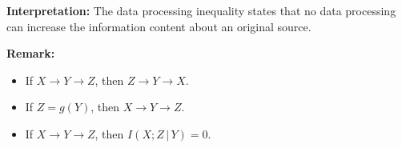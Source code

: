 \noindent\textbf{Interpretation:} The data processing inequality states that no data processing can increase the information content about an original source.

\noindent\textbf{Remark:}
\begin{itemize}
    \item If $X\to Y \to Z$, then $Z \to Y \to X$.
    \item If $Z=g(Y)$, then $X \to Y \to Z$.
    \item If $X\to Y \to Z$, then $I(X;Z\,|\,Y)=0$.
\end{itemize}
